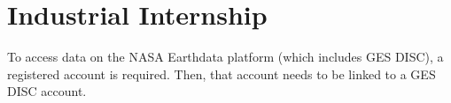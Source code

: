 \documentclass[../00_main.tex]{subfiles}
\begin{document}
\section{Industrial Internship}

To access data on the NASA Earthdata platform (which includes GES DISC),
a registered account is required. Then, that account needs to be linked to
a GES DISC account.
\end{document}
